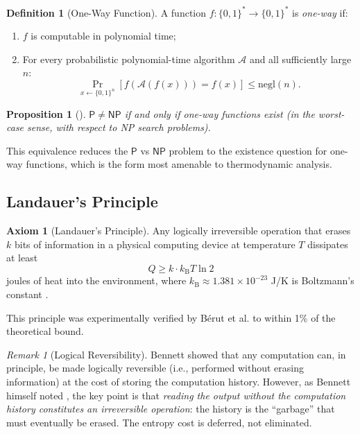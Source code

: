 \documentclass[12pt, a4paper]{article}
\theoremstyle{plain}
\newtheorem{proposition}[theorem]{Proposition}
\theoremstyle{definition}
\newtheorem{definition}[theorem]{Definition}
\newtheorem{axiom}[theorem]{Axiom}
\theoremstyle{remark}
\newtheorem{remark}[theorem]{Remark}
\newcommand{\Pc}{\mathsf{P}}
\newcommand{\NPc}{\mathsf{NP}}
\newcommand{\negl}{\mathrm{negl}}
\newcommand{\kB}{k_{\mathrm{B}}}
\begin{document}
\begin{definition}[One-Way Function]\label{def:owf}
  A function $f: \{0,1\}^* \to \{0,1\}^*$ is \emph{one-way} if:
  \begin{enumerate}[label=(\roman*)]
    \item $f$ is computable in polynomial time;
    \item For every probabilistic polynomial-time algorithm $\mathcal{A}$
      and all sufficiently large $n$:
      \begin{equation}\label{eq:owf}
        \Pr_{x \leftarrow \{0,1\}^n}\left[f(\mathcal{A}(f(x))) = f(x)\right]
        \leq \negl(n).
      \end{equation}
  \end{enumerate}
\end{definition}

\begin{proposition}[\citet{CookStatement}]\label{prop:owf_equiv}
  $\Pc \neq \NPc$ if and only if one-way functions exist (in the
  worst-case sense, with respect to NP search problems).
\end{proposition}

This equivalence reduces the $\Pc$ vs $\NPc$ problem to the existence
question for one-way functions, which is the form most amenable to
thermodynamic analysis.

\subsection{Landauer's Principle}

\begin{axiom}[Landauer's Principle]\label{ax:landauer}
  Any logically irreversible operation that erases $k$ bits of information
  in a physical computing device at temperature $T$ dissipates at least
  \begin{equation}\label{eq:landauer}
    Q \geq k \cdot \kB T \ln 2
  \end{equation}
  joules of heat into the environment, where $\kB \approx 1.381 \times
  10^{-23}$ J/K is Boltzmann's constant \citep{Landauer1961}.
\end{axiom}

This principle was experimentally verified by B\'erut et al.
\citep{BeruttEtAl2012} to within 1\% of the theoretical bound.

\begin{remark}[Logical Reversibility]
  Bennett \citep{Bennett1973} showed that any computation can, in principle,
  be made logically reversible (i.e., performed without erasing information)
  at the cost of storing the computation history. However, as Bennett himself
  noted \citep{Bennett1982}, the key point is that \emph{reading the output
  without the computation history constitutes an irreversible operation}:
  the history is the ``garbage'' that must eventually be erased. The entropy
  cost is deferred, not eliminated.
\end{remark}
\end{document}
